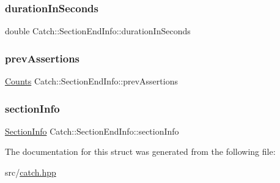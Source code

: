 \subsubsection{\texorpdfstring{duration\+In\+Seconds}{durationInSeconds}}
{\footnotesize\ttfamily double Catch\+::\+Section\+End\+Info\+::duration\+In\+Seconds}

\mbox{\label{struct_catch_1_1_section_end_info_ae70b154cbc05b5dd2901d97f89303d8c}} 
\subsubsection{\texorpdfstring{prev\+Assertions}{prevAssertions}}
{\footnotesize\ttfamily \hyperlink{struct_catch_1_1_counts}{Counts} Catch\+::\+Section\+End\+Info\+::prev\+Assertions}

\mbox{\label{struct_catch_1_1_section_end_info_a2d44793392cb83735d086d726822abe9}} 
\subsubsection{\texorpdfstring{section\+Info}{sectionInfo}}
{\footnotesize\ttfamily \hyperlink{struct_catch_1_1_section_info}{Section\+Info} Catch\+::\+Section\+End\+Info\+::section\+Info}



The documentation for this struct was generated from the following file\+:\begin{DoxyCompactItemize}
\item 
src/\hyperlink{catch_8hpp}{catch.\+hpp}\end{DoxyCompactItemize}
